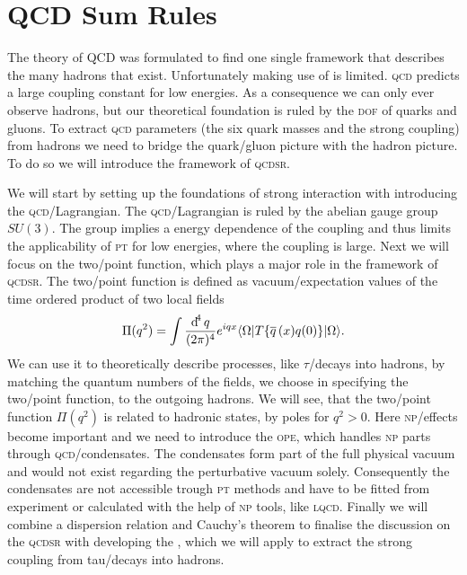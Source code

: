 \documentclass[../../index.tex]{subfiles}
\begin{document}
\chapter{QCD Sum Rules}
\label{ch:theoreticalBackground}
The theory of \textsc{QCD} was formulated to find one single framework that
describes the many hadrons that exist. Unfortunately making use of
 is limited. \textsc{qcd} predicts a
large coupling constant for low energies. As a consequence we can only ever
observe hadrons, but our theoretical foundation is ruled by the \textsc{dof} of
quarks and gluons. To extract \textsc{qcd} parameters (the six quark masses and
the strong coupling) from hadrons we need to bridge the quark\-/gluon picture
with the hadron picture. To do so we will introduce the framework of
\textsc{qcdsr}.

We will start by setting up the foundations of strong interaction with
introducing the \textsc{qcd}\-/Lagrangian. The \textsc{qcd}\-/Lagrangian is
ruled by the abelian gauge group $SU(3)$. The group implies a energy dependence
of the coupling and thus limits the applicability of \textsc{pt} for low
energies, where the coupling is large. Next we will focus on the two\-/point
function, which plays a major role in the framework of \textsc{qcdsr}. The
two\-/point function is defined as vacuum\-/expectation values of the time
ordered product of two local fields
\begin{equation}
  \Pi(q^2) = \int\fdif{q} e^{iqx} \langle\Omega\vert T\{ \anti{q}(x)q(0) \} \vert\Omega\rangle.
\end{equation}
We can use it to theoretically describe processes, like $\tau$\-/decays into
hadrons, by matching the quantum numbers of the fields, we choose in specifying
the two\-/point function, to the outgoing hadrons. We will see, that the
two\-/point function $\Pi(q^2)$ is related to hadronic states, by poles for $q^2
> 0$. Here \textsc{np}\-/effects become important and we need to introduce the
\textsc{ope}, which handles \textsc{np} parts through
\textsc{qcd}\-/condensates. The condensates form part of the full physical
vacuum and would not exist regarding the perturbative vacuum solely.
Consequently the condensates are not accessible trough \textsc{pt} methods and
have to be fitted from experiment or calculated with the help of \textsc{np}
tools, like \textsc{lqcd}. Finally we will combine a dispersion relation and
Cauchy's theorem to finalise the discussion on the \textsc{qcdsr} with
developing the , which we will apply to
extract the strong coupling from tau\-/decays into hadrons.
\end{document}
